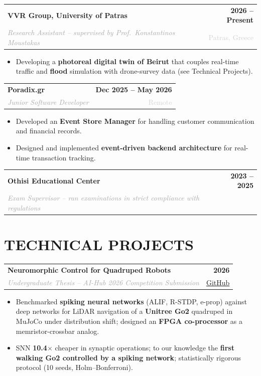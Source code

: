 \documentclass[10pt, a4paper]{article}
\makeatletter
\newcommand{\cvitem}[4]{
    \noindent
    \begin{tabularx}{\textwidth}{@{}X r@{}}
        \textbf{#1} & \textcolor{primary}{\textbf{#2}} \\
        \textit{\textcolor{darkgray}{#3}} & \textcolor{lightgray}{\small #4} \\
    \end{tabularx}
    \vspace{2pt}
}
\makeatother
\begin{document}
\cvitem
{VVR Group, University of Patras}
{2026 -- Present}
{Research Assistant -- supervised by Prof.\ Konstantinos Moustakas}
{Patras, Greece}

\begin{itemize}[leftmargin=1.2em, topsep=0pt, itemsep=1pt]
    \item Developing a \textbf{photoreal digital twin of Beirut} that couples real-time traffic and \textbf{flood} simulation with drone-survey data (see Technical Projects).
\end{itemize}

\vspace{0.35em}

\cvitem
{Poradix.gr}
{Dec 2025 -- May 2026}
{Junior Software Developer}
{Remote}

\begin{itemize}[leftmargin=1.2em, topsep=0pt, itemsep=1pt]
    \item Developed an \textbf{Event Store Manager} for handling customer communication and financial records.
    \item Designed and implemented \textbf{event-driven backend architecture} for real-time transaction tracking.
\end{itemize}

\vspace{0.35em}

\cvitem
{Othisi Educational Center}
{2023 -- 2025}
{Exam Supervisor -- ran examinations in strict compliance with regulations}
{}

\section*{TECHNICAL PROJECTS}

\cvitem
{Neuromorphic Control for Quadruped Robots}
{2026}
{Undergraduate Thesis -- AI-Hub 2026 Competition Submission}
{\href{https://github.com/Kostantinoskanell/thesis}{GitHub}}

\begin{itemize}[leftmargin=1.2em, topsep=0pt, itemsep=1pt]
    \item Benchmarked \textbf{spiking neural networks} (ALIF, R-STDP, e-prop) against deep networks for LiDAR navigation of a \textbf{Unitree Go2} quadruped in MuJoCo under distribution shift; designed an \textbf{FPGA co-processor} as a memristor-crossbar analog.
    \item SNN \textbf{10.4$\times$} cheaper in synaptic operations; to our knowledge the \textbf{first walking Go2 controlled by a spiking network}; statistically rigorous protocol (10 seeds, Holm--Bonferroni).
\end{itemize}
\end{document}
